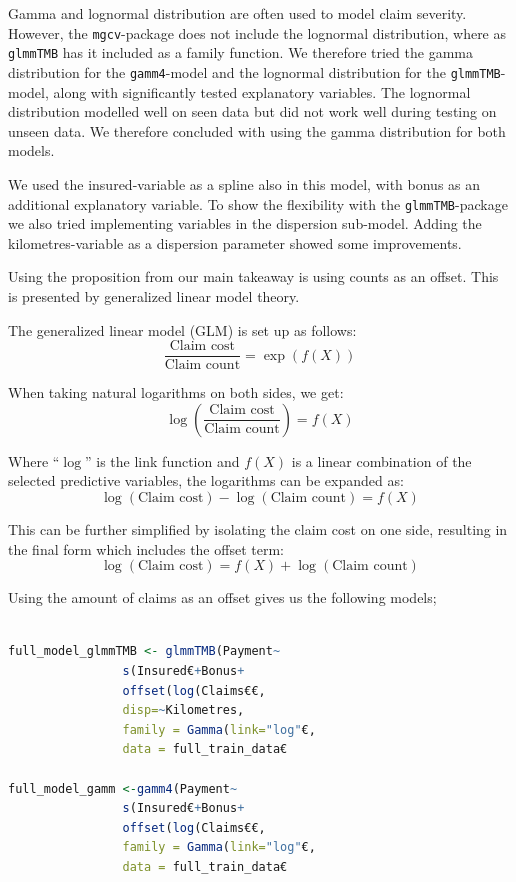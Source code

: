 \documentclass[12pt, twoside,hidelinks]{article}
\theoremstyle{definition}
\numberwithin{equation}{section}
\begin{document}
\newpage


Gamma and lognormal distribution are often used to model claim severity. However, the \texttt{mgcv}-package does not include the lognormal distribution, where as \texttt{glmmTMB} has it included as a family function.
We therefore tried the gamma distribution for the \texttt{gamm4}-model and the lognormal distribution for the \texttt{glmmTMB}-model, along with significantly tested explanatory variables. The lognormal distribution modelled well on seen data but did not work well during testing on unseen data. We therefore concluded with using the gamma distribution for both models.
\newline

We used the insured-variable as a spline also in this model, with bonus as an additional explanatory variable. To show the flexibility with the \texttt{glmmTMB}-package we also tried implementing variables in the dispersion sub-model. Adding the kilometres-variable as a dispersion parameter showed some improvements.
\newline

Using the proposition from \citet{tiwari2020modeling} our main takeaway is using counts as an offset. This is presented by generalized linear model theory.


\noindent
The generalized linear model (GLM) is set up as follows:
\begin{equation}
    \frac{\text{Claim cost}}{\text{Claim count}} = \exp(f(X))
\end{equation}\label{offsetfunction}

\noindent
When taking natural logarithms on both sides, we get:
    \[ \log\left(\frac{\text{Claim cost}}{\text{Claim count}}\right) = f(X) \]


\noindent
Where ``$\log$'' is the link function and $f(X)$ is a linear combination of the selected predictive variables, the logarithms can be expanded as:
\[ \log(\text{Claim cost}) - \log(\text{Claim count}) = f(X) \]

\noindent
This can be further simplified by isolating the claim cost on one side, resulting in the final form which includes the offset term:
    \[\log(\text{Claim cost}) = f(X) + \log(\text{Claim count})\]

\noindent
Using the amount of claims as an offset gives us the following models;





\begin{lstlisting}[language=R]

full_model_glmmTMB <- glmmTMB(Payment~
                s(Insured€+Bonus+
                offset(log(Claims€€,
                disp=~Kilometres,
                family = Gamma(link="log"€, 
                data = full_train_data€

full_model_gamm <-gamm4(Payment~
                s(Insured€+Bonus+
                offset(log(Claims€€,
                family = Gamma(link="log"€, 
                data = full_train_data€

\end{lstlisting}
\end{document}
